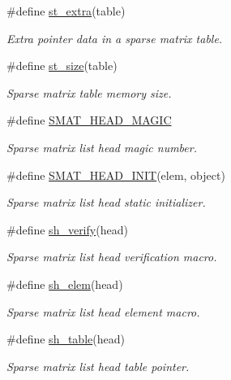 \begin{CompactItemize}
\#define \hyperlink{group__dbprim__smat_ga39}{st\_\-extra}(table)
\begin{CompactList}\small\item\em Extra pointer data in a sparse matrix table. \item\end{CompactList}\item 
\#define \hyperlink{group__dbprim__smat_ga40}{st\_\-size}(table)
\begin{CompactList}\small\item\em Sparse matrix table memory size. \item\end{CompactList}\item 
\#define \hyperlink{group__dbprim__smat_ga41}{SMAT\_\-HEAD\_\-MAGIC}
\begin{CompactList}\small\item\em Sparse matrix list head magic number. \item\end{CompactList}\item 
\#define \hyperlink{group__dbprim__smat_ga42}{SMAT\_\-HEAD\_\-INIT}(elem, object)
\begin{CompactList}\small\item\em Sparse matrix list head static initializer. \item\end{CompactList}\item 
\#define \hyperlink{group__dbprim__smat_ga43}{sh\_\-verify}(head)
\begin{CompactList}\small\item\em Sparse matrix list head verification macro. \item\end{CompactList}\item 
\#define \hyperlink{group__dbprim__smat_ga44}{sh\_\-elem}(head)
\begin{CompactList}\small\item\em Sparse matrix list head element macro. \item\end{CompactList}\item 
\#define \hyperlink{group__dbprim__smat_ga45}{sh\_\-table}(head)
\begin{CompactList}\small\item\em Sparse matrix list head table pointer. \item\end{CompactList}\item 

\end{CompactItemize}
